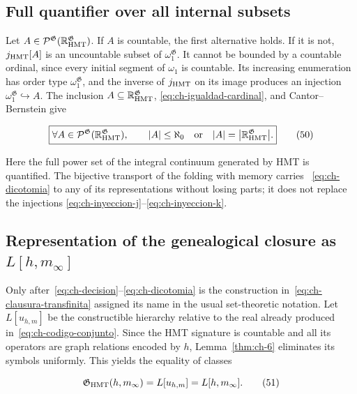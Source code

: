 \subsection{Full quantifier over all internal subsets}

Let \(A\in\mathcal P^{\mathfrak G}
(\mathbb R_{\rm HMT}^{\mathfrak G})\). If \(A\) is countable, the first
alternative holds. If it is not, \(j_{\rm HMT}[A]\) is an uncountable subset
of \(\omega_1^{\mathfrak G}\). It cannot be bounded by a countable ordinal,
since every initial segment of \(\omega_1\) is countable. Its increasing
enumeration has order type \(\omega_1^{\mathfrak G}\), and the inverse of
\(j_{\rm HMT}\) on its image produces an injection
\(\omega_1^{\mathfrak G}\hookrightarrow A\). The inclusion
\(A\subseteq\mathbb R_{\rm HMT}^{\mathfrak G}\),
\eqref{eq:ch-igualdad-cardinal}, and Cantor--Bernstein give

\[
 \boxed{
 \forall A\in\mathcal P^{\mathfrak G}
   (\mathbb R_{\rm HMT}^{\mathfrak G}),\qquad
 |A|\le\aleph_0
 \quad\text{or}\quad
 |A|=\bigl|\mathbb R_{\rm HMT}^{\mathfrak G}\bigr|.}
\tag{50}\label{eq:ch-dicotomia}
\]

Here the full power set of the integral continuum generated by HMT is
quantified. The bijective transport of the folding with memory carries
~\eqref{eq:ch-dicotomia} to any of its representations without losing parts;
it does not replace the injections
\eqref{eq:ch-inyeccion-j}--\eqref{eq:ch-inyeccion-k}.

\subsection{Representation of the genealogical closure as \texorpdfstring{\(L[h,m_\infty]\)}{L[h,m-infinity]}}

Only after~\eqref{eq:ch-decision}--\eqref{eq:ch-dicotomia} is the construction
in~\eqref{eq:ch-clausura-transfinita} assigned its name in the usual
set-theoretic notation. Let \(L[u_{h,m}]\) be the constructible hierarchy
relative to the real already produced in~\eqref{eq:ch-codigo-conjunto}. Since
the HMT signature is countable and all its operators are graph relations
encoded by \(h\), Lemma~\ref{thm:ch-6} eliminates its symbols uniformly. This
yields the equality of classes

\[
 \mathfrak G_{\rm HMT}(h,m_\infty)
 =L[u_{h,m}]=L[h,m_\infty].
\tag{51}\label{eq:ch-representacion-L}
\]

